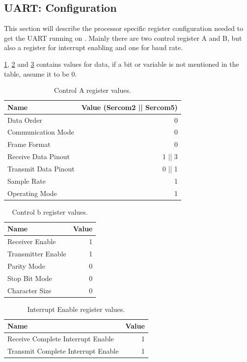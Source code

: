 \subsection{UART: Configuration}
This section will describe the processor specific register configuration needed to get the UART running on \SAMD. Mainly there are two control register A and B, but also a register for interrupt enabling and one for baud rate.

\cref{tab:UARTControlA}, \cref{tab:UARTControlB} and \cref{tab:UARTINTENSET} contains values for data, if a bit or variable is not mentioned in the table, assume it to be 0.

\begin{table}[H]
	\begin{tabular}{lr}
		\toprule
		Name & Value (Sercom2 || Sercom5) \\
		\midrule
		Data Order & 0 \\ 
		Communication Mode & 0 \\ 
		Frame Format & 0 \\ 
		Receive Data Pinout & 1 || 3 \\ 
		Transmit Data Pinout & 0 || 1 \\ 
		Sample Rate & 1 \\ 
		Operating Mode & 1 \\ 
		\bottomrule
	\end{tabular} 
	\centering
	\caption{Control A register values.}
	\label{tab:UARTControlA}
\end{table}

\begin{table}[H]
	\begin{tabular}{lr}
		\toprule
		Name & Value \\
		\midrule
		Receiver Enable & 1 \\ 
		Transmitter Enable & 1 \\ 
		Parity Mode & 0 \\ 
		Stop Bit Mode & 0 \\ 
		Character Size & 0 \\ 
		\bottomrule
	\end{tabular} 
	\centering
	\caption{Control b register values.}
	\label{tab:UARTControlB}
\end{table}

\begin{table}[H]
	\begin{tabular}{lr}
		\toprule
		Name & Value \\
		\midrule
		Receive Complete Interrupt Enable & 1 \\ 
		Transmit Complete Interrupt Enable & 1 \\ 
		\bottomrule
	\end{tabular} 
	\centering
	\caption{Interrupt Enable register values.}
	\label{tab:UARTINTENSET}
\end{table}


